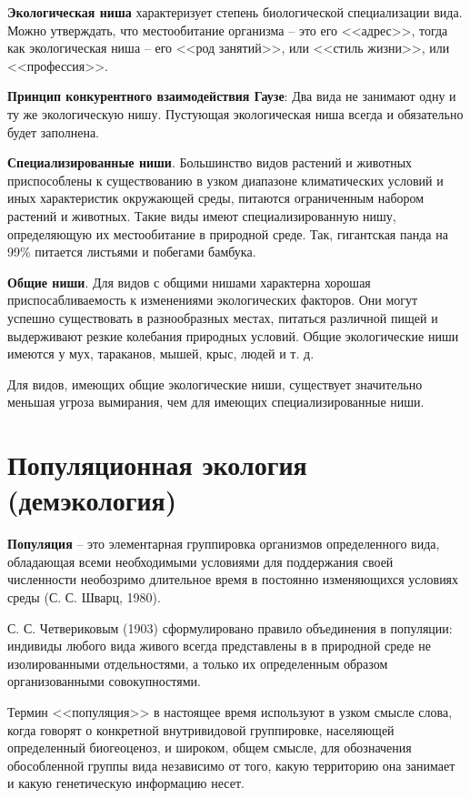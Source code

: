 \documentclass[a5paper, 11pt]{extarticle}
\theoremstyle{definition}
\theoremstyle{definition}
\theoremstyle{definition}
\numberwithin{figure}{section}
\begin{document}
\textbf{Экологическая ниша} характеризует степень биологической специализации вида. Можно утверждать, что местообитание организма -- это его <<адрес>>, тогда как экологическая ниша -- его <<род занятий>>, или <<стиль жизни>>, или <<профессия>>.

\textbf{Принцип конкурентного взаимодействия Гаузе}: Два вида не занимают одну и ту же экологическую нишу. Пустующая экологическая ниша всегда и обязательно будет заполнена.

\textbf{Специализированные ниши}. Большинство видов растений и животных приспособлены к существованию в узком диапазоне климатических условий и иных характеристик окружающей среды, питаются ограниченным набором растений и животных. Такие виды имеют специализированную  нишу, определяющую их местообитание в природной среде. Так, гигантская панда на 99\% питается листьями и побегами бамбука.

\textbf{Общие ниши}. Для видов с общими нишами характерна хорошая приспосабливаемость к изменениями экологических факторов. Они могут успешно существовать в разнообразных местах, питаться различной пищей и выдерживают резкие колебания природных условий. Общие экологические ниши имеются у мух, тараканов, мышей, крыс, людей и т. д.

Для видов, имеющих общие экологические ниши, существует значительно меньшая угроза вымирания, чем для имеющих специализированные ниши.

\section{Популяционная экология (демэкология)}

\textbf{Популяция} -- это элементарная группировка организмов определенного вида, обладающая всеми необходимыми условиями для поддержания своей численности необозримо длительное время в постоянно изменяющихся условиях среды (С. С. Шварц, 1980).

С. С. Четвериковым (1903) сформулировано правило объединения в популяции: индивиды любого вида живого всегда представлены в в природной среде не изолированными отдельностями, а только их определенным образом организованными совокупностями.

Термин <<популяция>> в настоящее время используют в узком смысле слова, когда говорят о конкретной внутривидовой группировке, населяющей определенный биогеоценоз, и широком, общем смысле, для обозначения обособленной группы вида независимо от того, какую территорию она занимает и какую генетическую информацию несет.
\end{document}
